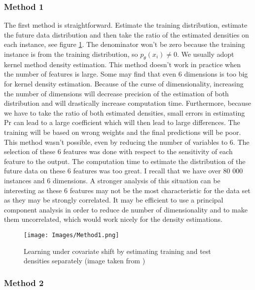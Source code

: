 \documentclass{article}
\newcommand{\PR}{\text{Pr}}
\begin{document}
\subsubsection{Method 1}

The first method is straightforward. Estimate the training distribution, estimate the future data distribution and then take the ratio of the estimated densities on each instance, see figure \ref{fig: Method1}. The denominator won't be zero because the training instance is from the training distribution, so $p_{\theta}(x_i) \neq 0$. We usually adopt kernel method density estimation. This method doesn't work in practice when the number of features is large. Some may find that even 6 dimensions is too big for kernel density estimation. Because of the curse of dimensionality, increasing the number of dimensions will decrease precision of the estimation of both distribution and will drastically increase computation time. Furthermore, because we have to take the ratio of both estimated densities, small errors in estimating $\PR$ can lead to a large coefficient which will then lead to large differences. The training will be based on wrong weights and the final predictions will be poor. This method wasn't possible, even by reducing the number of variables to 6. The selection of these 6 features was done with respect to the sensitivity of each feature to the output. The computation time to estimate the distribution of the future data on these 6 features was too great. I recall that we have over 80 000 instances and 6 dimensions. A stronger analysis of this situation can be interesting as these 6 features may not be the most characteristic for the data set as they may be strongly correlated. It may be efficient to use a principal component analysis in order to reduce de number of dimensionality and to make them uncorrelated, which would work nicely for the density estimations.

\begin{figure}[!ht]
\centering
\texttt{[image: Images/Method1.png]}
\caption{Learning under covariate shift by estimating training
and test densities separately (image taken from \cite{pict})}
\label{fig: Method1}
\end{figure}



\subsubsection{Method 2}
\end{document}
